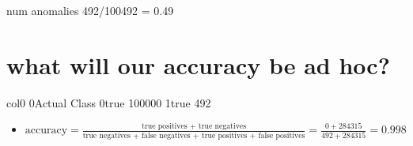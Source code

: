 \documentclass[letterpaper,10pt,english]{jupyterBook}
\begin{document}
\begin{sphinxVerbatim}[commandchars=\\\{\}]
\PYG{p}{[}\PYG{p}{]}\PYG{p}{[}\PYG{p}{]}
\end{sphinxVerbatim}

\begin{sphinxVerbatim}[commandchars=\\\{\}]
num anomalies 492/100492 = 0.49\PYGZpc{}
\end{sphinxVerbatim}


\chapter{what will our accuracy be ad hoc?}
\label{\detokenize{imbalanced_data:what-will-our-accuracy-be-ad-hoc}}
\begin{sphinxVerbatim}[commandchars=\\\{\}]
     
\end{sphinxVerbatim}

\begin{sphinxVerbatim}[commandchars=\\\{\}]
col\PYGZus{}0   0\PYGZus{}Actual
Class           
0\PYGZus{}true    100000
1\PYGZus{}true       492
\end{sphinxVerbatim}
\begin{itemize}
\item {} 
\sphinxAtStartPar
\(\text{accuracy} = \frac{\text{true positives + true negatives}}{\text{true negatives + false negatives + true positives + false positives}} = \frac{0 + 284315}{492 + 284315} = 0.998\)

\end{itemize}
\end{document}
